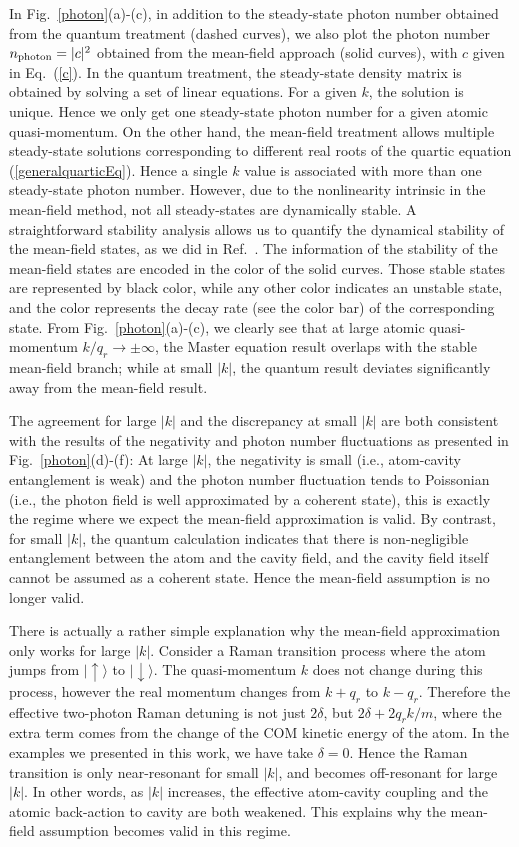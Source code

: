 \documentclass[atoms,article,submit,moreauthors,pdftex,12pt,a4paper]{mdpi}
\begin{document}
In Fig.~\ref{photon}(a)-(c), in addition to the steady-state photon number obtained from the quantum treatment (dashed curves), we also plot the photon number $n_{\rm photon}=|c|^2$ obtained from the mean-field approach (solid curves), with $c$ given in Eq.~(\ref{c}). In the quantum treatment, the steady-state density matrix is obtained by solving a set of linear equations. For a given $k$, the solution is unique. Hence we only get one steady-state photon number for a given atomic quasi-momentum. On the other hand, the mean-field treatment allows multiple steady-state solutions corresponding to different real roots of the quartic equation (\ref{generalquarticEq}). Hence a single $k$ value is associated with more than one steady-state photon number. However, due to the nonlinearity intrinsic in the mean-field method, not all steady-states are dynamically stable. A straightforward stability analysis allows us to quantify the dynamical stability of the mean-field states, as we did in Ref.~\cite{cavitySOC}. The information of the stability of the mean-field states are encoded in the color of the solid curves. Those stable states are represented by black color, while any other color indicates an unstable state, and the color represents the decay rate (see the color bar) of the corresponding state. From Fig.~\ref{photon}(a)-(c), we clearly see that at large atomic quasi-momentum $k/q_r \longrightarrow  \pm \infty$, the Master equation result overlaps with the stable mean-field branch; while at small $|k|$, the quantum result deviates significantly away from the mean-field result.

The agreement for large $|k|$ and the discrepancy at small $|k|$ are both consistent with the results of the negativity and photon number fluctuations as presented in Fig.~\ref{photon}(d)-(f): At large $|k|$, the negativity is small (i.e., atom-cavity entanglement is weak) and the photon number fluctuation tends to Poissonian (i.e., the photon field is well approximated by a coherent state), this is exactly the regime where we expect the mean-field approximation is valid. By contrast, for small $|k|$, the quantum calculation indicates that there is non-negligible entanglement between the atom and the cavity field, and the cavity field itself cannot be assumed as a coherent state. Hence the mean-field assumption is no longer valid.

There is actually a rather simple explanation why the mean-field approximation only works for large $|k|$. Consider a Raman transition process where the atom jumps from $|\uparrow \rangle$ to $|\downarrow \rangle$. The quasi-momentum $k$ does not change during this process, however the real momentum changes from $k+q_r$ to $k-q_r$. Therefore the effective two-photon Raman detuning is not just $2\delta$, but $2\delta +2q_rk/m$, where the extra term comes from the change of the COM kinetic energy of the atom. In the examples we presented in this work, we have take $\delta=0$. Hence the Raman transition is only near-resonant for small $|k|$, and becomes off-resonant for large $|k|$. In other words, as $|k|$ increases, the effective atom-cavity coupling and the atomic back-action to cavity are both weakened. This explains why the mean-field assumption becomes valid in this regime.   
\end{document}
